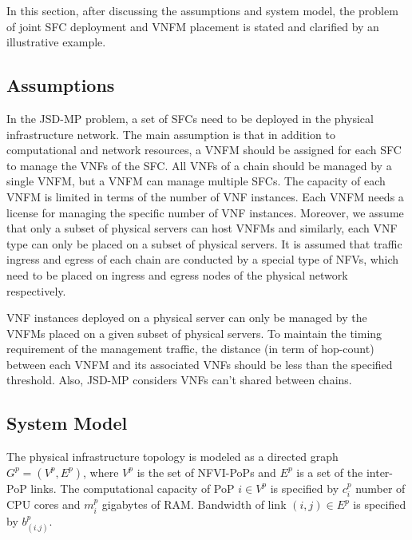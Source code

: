 In this section, after discussing the assumptions and system model, the problem of joint SFC deployment and VNFM placement is stated and clarified by an illustrative example.

\subsection{Assumptions}\label{subsec:assumptions}
In the JSD-MP problem, a set of SFCs need to be deployed in the physical infrastructure network.
The main assumption is that in addition to computational and network resources,
a VNFM should be assigned for each SFC to manage the VNFs of the SFC.
All VNFs of a chain should be managed by a single VNFM, but a VNFM can manage multiple SFCs.
The capacity of each VNFM is limited in terms of the number of VNF instances.
Each VNFM needs a license for managing the specific number of VNF instances.
Moreover, we assume that only a subset of physical servers can host VNFMs and similarly,
each VNF type can only be placed on a subset of physical servers. It is assumed that traffic ingress and egress of each chain are conducted by a special type of NFVs, which need to be placed on ingress and egress nodes  of the physical network respectively.

VNF instances deployed on a physical server can only be managed by the VNFMs placed on a given subset of physical servers. To maintain the timing requirement of the management traffic, the distance (in term of hop-count) between each VNFM and its associated VNFs should be less than the specified threshold.
Also, JSD-MP considers VNFs can't shared between chains.

\subsection{System Model}\label{subsec:sysmodel}
%
%

The physical infrastructure topology is modeled as a directed graph \(G^p=(V^p, E^p)\),
where \(V^p\) is the set of NFVI-PoPs and \(E^p\) is a set of the inter-PoP links.
The computational capacity of PoP \(i \in V^p\) is specified by \(c^p_i\) number of CPU cores and \(m^p_i\) gigabytes of RAM.
Bandwidth of link \((i,j) \in E^p\) is specified by \(b^p_{(i.j)}\).

